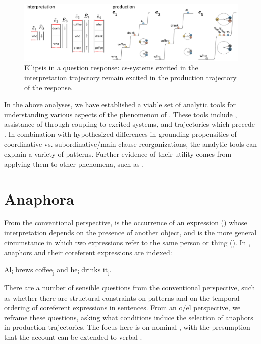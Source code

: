   
\begin{figure}
\includegraphics[width=\textwidth]{figures/Tilsen-img151.png}
\caption{Ellipsis in a question response: cs-systems excited in the interpretation trajectory remain excited in the production trajectory of the response.}
\label{fig:7:7}
\end{figure}
 

  In the above analyses, we have established a viable set of analytic tools for understanding various aspects of the phenomenon of . These tools include , assistance of  through coupling to excited systems, and  trajectories which precede . In combination with hypothesized differences in grounding propensities of coordinative vs. subordinative/main clause reorganizations, the analytic tools can explain a variety of  patterns. Further evidence of their utility comes from applying them to other phenomena, such as .

\section{Anaphora}

From the conventional perspective,  is the occurrence of an expression () whose interpretation depends on the presence of another object, and  is the more general circumstance in which two expressions refer to the same person or thing (\citealt{HankamerSag1976,Huang2000,Reinhart1983,Reinhart2016,Safir2004}). In , anaphors and their coreferent expressions are indexed:

\ea\label{ex:7:9}
    {Al\textsubscript{i} brews coffee\textsubscript{j} and he\textsubscript{i} drinks it\textsubscript{j}}.
\z

  There are a number of sensible questions from the conventional perspective, such as whether there are structural constraints on  patterns and on the temporal ordering of coreferent expressions in sentences. From an o/el perspective, we reframe these questions, asking what conditions induce the selection of anaphors in production trajectories. The focus here is on nominal , with the presumption that the account can be extended to verbal . 

